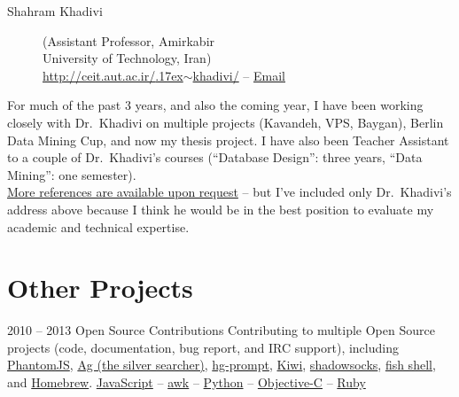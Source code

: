 \documentclass{tccv}
\renewcommand{\tilde}{\raise.17ex\hbox{$\scriptstyle\sim$}}
\begin{document}
{{\begin{description}
\item[Shahram Khadivi] (Assistant Professor, Amirkabir \\University of Technology, Iran)
\\
\href{http://ceit.aut.ac.ir/~khadivi/}{http://ceit.aut.ac.ir/{\tilde}khadivi/} -- \href{mailto:khadivi@aut.ac.ir}{Email}
\end{description}
%
\vspace{-3pt}
For much of the past 3 years, and also the coming year, I have been working closely with Dr.\ Khadivi on \mbox{multiple} projects (Kavandeh, VPS, Baygan), Berlin Data \mbox{Mining} Cup, and now my thesis project. I have also been Teacher Assistant to a couple of Dr.\ Khadivi's courses (``Database Design'': three years, ``Data Mining'': one semester).
\\[6pt]
\uline{More references are available upon request} -- but I've \mbox{included} only Dr.\ Khadivi's address above because I think he would be in the best position to evaluate my academic and technical expertise.








\section{Other Projects}

\begin{project_list}
	 
\item{2010 -- 2013}
	 {}
	 {Open Source Contributions}
	 {Contributing to multiple Open Source projects (code, documentation, bug report, and IRC support), \mbox{including} %
	 \href{http://phantomjs.org}{PhantomJS}, %
	 \href{https://github.com/ggreer/the_silver_searcher}{Ag (the silver searcher)}, %
	 \href{http://bitbucket.org/sjl/hg-prompt/}{hg-prompt}, %
	 \href{https://github.com/allending/Kiwi}{Kiwi}, %
	 \href{https://github.com/clowwindy/shadowsocks/}{shadowsocks}, %
	 \href{http://fishshell.com}{fish shell}, and %
	 \href{https://github.com/mxcl/homebrew}{Homebrew}.}%
	 {%
	 	\href{https://developer.mozilla.org/en-US/docs/Web/JavaScript}{JavaScript} -- %
	 	\href{http://awk.info}{awk} -- %
		\href{http://python.org}{Python} -- %
		\href{https://en.wikipedia.org/wiki/Objective-C}{Objective-C} -- %
		\href{https://www.ruby-lang.org/en/}{Ruby}%
	 }
	 
\end{project_list}

}}
\end{document}
